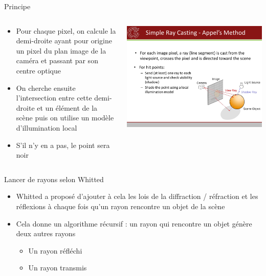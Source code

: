 \begin{frame}{Principe}
    \begin{columns}
        \begin{column}{.49\textwidth}
            \begin{itemize}
                \item Pour chaque pixel, on calcule la demi-droite ayant pour origine un pixel du plan image de la caméra et passant par son centre optique 
                \item On cherche ensuite l'intersection entre cette demi-droite et un élément de la scène puis on utilise un modèle d'illumination local
                \item S'il n'y en a pas, le point sera noir
            \end{itemize}
        \end{column}

        \begin{column}{.49\textwidth}
            \includegraphics[width=\columnwidth]{figs/raycasting.pdf}
        \end{column}
    \end{columns}
\end{frame}

\begin{frame}{Lancer de rayons selon Whitted}
    \begin{itemize}
        \item Whitted a proposé d'ajouter à cela les lois de la diffraction / réfraction et les réflexions à chaque fois qu'un rayon rencontre un objet de la scène
        \item Cela donne un algorithme récursif : un rayon qui rencontre un objet génère deux autres rayons
        \begin{itemize}
            \item Un rayon réfléchi 
            \item Un rayon transmis
        \end{itemize}
    \end{itemize}
\end{frame}

